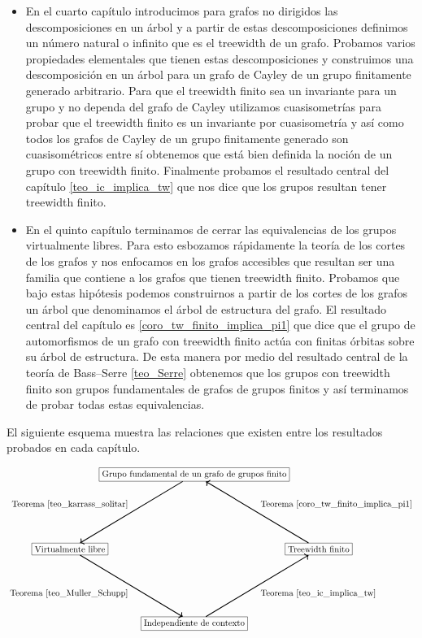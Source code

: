 \documentclass[tesis.tex]{subfiles}
\begin{document}
\begin{itemize}
		\item 
			En el cuarto capítulo introducimos para grafos no dirigidos las descomposiciones en un árbol y a partir de estas descomposiciones definimos un número natural o infinito que es el treewidth de un grafo.
			Probamos varios propiedades elementales que tienen estas descomposiciones y construimos una descomposición en un árbol para un grafo de Cayley de un grupo finitamente generado arbitrario.
			Para que el treewidth finito sea un invariante para un grupo y no dependa del grafo de Cayley utilizamos cuasisometrías para probar que el treewidth finito es un invariante por cuasisometría y así como todos los grafos de Cayley de un grupo finitamente generado son cuasisométricos entre sí obtenemos que está bien definida la noción de un grupo con treewidth finito.
			Finalmente probamos el resultado central del capítulo \ref{teo_ic_implica_tw} que nos dice que los grupos \ic resultan tener treewidth finito.
			
		\item 
			En el quinto capítulo terminamos de cerrar las equivalencias de los grupos virtualmente libres.
			Para esto esbozamos rápidamente la teoría de los cortes de los grafos y nos enfocamos en los grafos accesibles que resultan ser una familia que contiene a los grafos que tienen treewidth finito.
			Probamos que bajo estas hipótesis podemos construirnos a partir de los cortes de los grafos un árbol que denominamos el árbol de estructura del grafo.
			El resultado central del capítulo es \ref{coro_tw_finito_implica_pi1} que dice que el grupo de automorfismos de un grafo con treewidth finito actúa con finitas órbitas sobre su árbol de estructura. 
			De esta manera por medio del resultado central de la teoría de Bass--Serre  \ref{teo_Serre} obtenemos que los grupos con treewidth finito son grupos fundamentales de grafos de grupos finitos y así terminamos de probar todas estas equivalencias.
	\end{itemize}
		
	
	
	
	El siguiente esquema muestra las relaciones que existen entre los resultados probados en cada capítulo.
	
	\[	
	\begin{tikzpicture}
		\path 
		(0,0) node(a) [rectangle,draw] {Grupo fundamental de un grafo de grupos finito}
		(5,-3) node(b) [rectangle,draw] {Treewidth finito}
		(0,-6) node(c) [rectangle,draw] {Independiente de contexto}
		(-5,-3) node (d) [rectangle,draw] {Virtualmente libre};
		\draw   
		(d) edge[<-,line width=1.0pt,"Teorema \ref{teo_karrass_solitar}"] (a) 
		(c) edge[<-,line width=1.0pt,"Teorema \ref{teo_Muller_Schupp}"] (d)
		(b) edge[<-,line width=1.0pt,"Teorema \ref{teo_ic_implica_tw}"] (c)
		(a)  edge[<-,line width=1.0pt,"Teorema \ref{coro_tw_finito_implica_pi1}"] (b);
	\end{tikzpicture}
	\]
	
	
	
	
	
	
	
\end{document}
